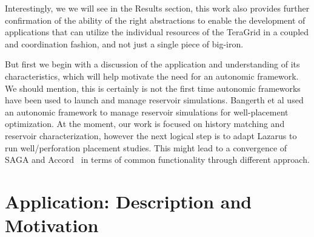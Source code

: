 \documentclass[conference,final]{IEEEtran}
\newcommand{\jhanote}[1]{ {\textcolor{red} { ***Jha: #1 }}}
\newcommand{\jhanote}[1]{}
\begin{document}

Interestingly, we we will see in the Results section, this work also
provides further confirmation of the ability of the right abstractions
to enable the development of applications that can utilize the
individual resources of the TeraGrid in a coupled and coordination
fashion, and not just a single piece of big-iron.

But first we begin with a discussion of the application and
understanding of its characteristics, which will help motivate the
need for an autonomic framework. We should mention, this is certainly
is not the first time autonomic frameworks have been used to launch
and manage reservoir simulations. Bangerth et al \cite{Manish} used an
autonomic framework to manage reservoir simulations for well-placement
optimization. At the moment, our work is focused on history matching
and reservoir characterization, however the next logical step is to
adapt Lazarus to run well/perforation placement studies. This might
lead to a convergence of SAGA and Accord~\cite{accord} in terms of
common functionality through different approach.



\section{Application: Description and Motivation} 
\end{document}
